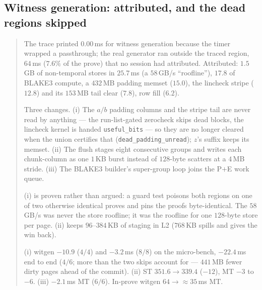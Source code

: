 \documentclass[11pt]{article}
\newcommand{\code}[1]{\texttt{#1}}
\newenvironment{optsummary}{%
  \begin{quote}\small
  \begin{description}
  \setlength{\itemsep}{1pt}\setlength{\parsep}{0pt}\setlength{\topsep}{2pt}
}{%
  \end{description}
  \end{quote}
}
\begin{document}
\subsection{Witness generation: attributed, and the dead regions skipped}\label{sec:witgen2}

\begin{optsummary}
\item[Baseline:] The trace printed $0.00\,$ms for witness generation because the timer wrapped a passthrough; the real generator ran outside the traced region, $64\,$ms ($7.6\%$ of the prove) that no session had attributed. Attributed: $1.5\,$GB of non-temporal stores in $25.7\,$ms (a $58\,$GB/s ``roofline''), $17.8$ of BLAKE3 compute, a $432\,$MB padding memset ($15.0$), the lincheck stripe ($12.8$) and its $153\,$MB tail clear ($7.8$), row fill ($6.2$).
\item[Improvement:] Three changes. (i) The $a/b$ padding columns and the stripe tail are never read by anything --- the run-list-gated zerocheck skips dead blocks, the lincheck kernel is handed \code{useful\_bits} --- so they are no longer cleared when the union certifies that (\code{dead\_padding\_unread}); $z$'s suffix keeps its memset. (ii) The flush stages eight consecutive groups and writes each chunk-column as one $1\,$KB burst instead of $128$-byte scatters at a $4\,$MB stride. (iii) The BLAKE3 builder's super-group loop joins the P$+$E work queue.
\item[Mechanism:] (i) is proven rather than argued: a guard test poisons both regions on one of two otherwise identical proves and pins the proofs byte-identical. The $58\,$GB/s was never the store roofline; it was the roofline for one $128$-byte store per page. (ii) keeps $96$--$384\,$KB of staging in L2 ($768\,$KB spills and gives the win back).
\item[Result:] (i) witgen $-10.9$ ($4/4$) and $-3.2\,$ms ($8/8$) on the micro-bench, $-22.4\,$ms end to end ($4/6$; more than the two skips account for --- $441\,$MB fewer dirty pages ahead of the commit). (ii) ST $351.6\to339.4$ ($-12$), MT $-3$ to $-6$. (iii) $-2.1\,$ms MT ($6/6$). In-prove witgen $64\to{\approx}35\,$ms MT.
\end{optsummary}
\end{document}
